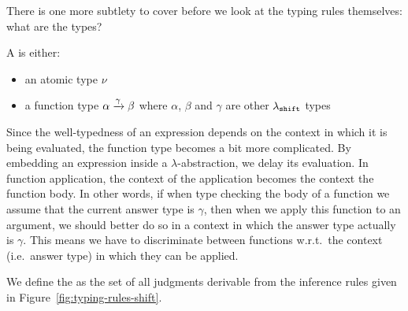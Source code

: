 There is one more subtlety to cover before we look at the typing rules
themselves: what are the types?

\begin{definition}
  A  is either:
  \begin{itemize}
  \item an atomic type $\nu$
  \item a function type $\alpha \xrightarrow{\gamma} \beta$ where $\alpha$, $\beta$
    and $\gamma$ are other $\lambda_{\mathtt{shift}}$ types
  \end{itemize}
\end{definition}

Since the well-typedness of an expression depends on the context in which
it is being evaluated, the function type becomes a bit more complicated. By
embedding an expression inside a $\lambda$-abstraction, we delay its
evaluation. In function application, the context of the application becomes
the context the function body. In other words, if when type checking the
body of a function we assume that the current answer type is $\gamma$, then
when we apply this function to an argument, we should better do so in a
context in which the answer type actually is $\gamma$. This means we have
to discriminate between functions w.r.t.\ the context (i.e.\ answer type) in
which they can be applied.

\begin{definition}
  We define the  as the set of all
  judgments derivable from the inference rules given in
  Figure~\ref{fig:typing-rules-shift}.
\end{definition}

